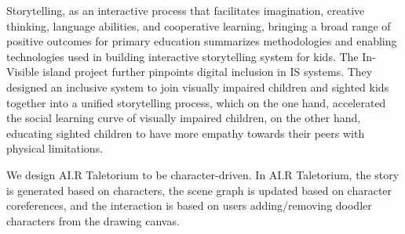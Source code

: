 Storytelling, as an interactive process that facilitates imagination, creative thinking, language abilities, and cooperative learning, bringing a broad range of positive outcomes for primary education \cite{Garzotto2014InteractiveSF} summarizes methodologies and enabling technologies used in building interactive storytelling system for kids. The In-Visible island project \cite{Talib2020InVisibleII} further pinpoints digital inclusion in IS systems. They designed an inclusive system to join visually impaired children and sighted kids together into a unified storytelling process, which on the one hand, accelerated the social learning curve of visually impaired children, on the other hand, educating sighted children to have more empathy towards their peers with physical limitations. 


We design AI.R Taletorium to be character-driven. In AI.R Taletorium, the story is generated based on characters\cite{Liu2020,Surikuchi2019CharacterCentricS}, the scene graph is updated based on character coreferences, and the interaction is based on users adding/removing doodler characters from the drawing canvas.